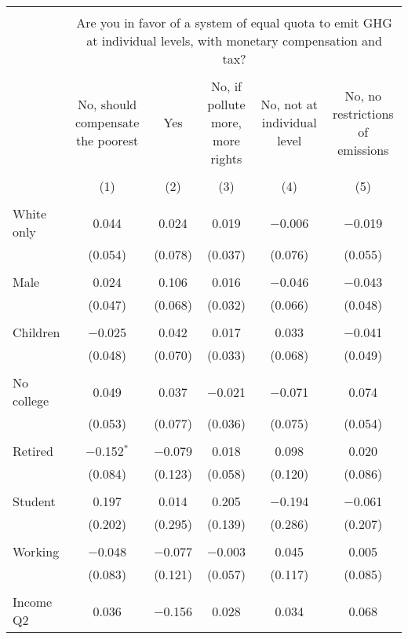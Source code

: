 
\begin{tabular}{@{\extracolsep{5pt}}lccccc} 
\\[-1.8ex]\hline 
\hline \\[-1.8ex] 
 & \multicolumn{5}{c}{Are you in favor of a system of equal quota to emit GHG at individual levels, with monetary compensation and tax?} \\ 
\cline{2-6} 
\\[-1.8ex] & No, should compensate the poorest & Yes & No, if pollute more, more rights & No, not at individual level & No, no restrictions of emissions \\ 
\\[-1.8ex] & (1) & (2) & (3) & (4) & (5)\\ 
\hline \\[-1.8ex] 
 White only & 0.044 & 0.024 & 0.019 & $-$0.006 & $-$0.019 \\ 
  & (0.054) & (0.078) & (0.037) & (0.076) & (0.055) \\ 
  & & & & & \\ 
 Male & 0.024 & 0.106 & 0.016 & $-$0.046 & $-$0.043 \\ 
  & (0.047) & (0.068) & (0.032) & (0.066) & (0.048) \\ 
  & & & & & \\ 
 Children & $-$0.025 & 0.042 & 0.017 & 0.033 & $-$0.041 \\ 
  & (0.048) & (0.070) & (0.033) & (0.068) & (0.049) \\ 
  & & & & & \\ 
 No college & 0.049 & 0.037 & $-$0.021 & $-$0.071 & 0.074 \\ 
  & (0.053) & (0.077) & (0.036) & (0.075) & (0.054) \\ 
  & & & & & \\ 
 Retired & $-$0.152$^{*}$ & $-$0.079 & 0.018 & 0.098 & 0.020 \\ 
  & (0.084) & (0.123) & (0.058) & (0.120) & (0.086) \\ 
  & & & & & \\ 
 Student & 0.197 & 0.014 & 0.205 & $-$0.194 & $-$0.061 \\ 
  & (0.202) & (0.295) & (0.139) & (0.286) & (0.207) \\ 
  & & & & & \\ 
 Working & $-$0.048 & $-$0.077 & $-$0.003 & 0.045 & 0.005 \\ 
  & (0.083) & (0.121) & (0.057) & (0.117) & (0.085) \\ 
  & & & & & \\ 
 Income Q2 & 0.036 & $-$0.156 & 0.028 & 0.034 & 0.068 \\ 

\end{tabular}
